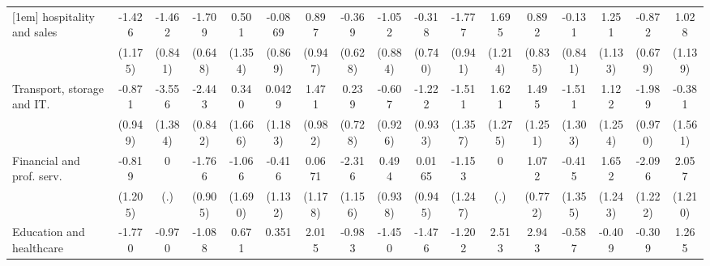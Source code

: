 {\begin{tabular}{l*{16}{c}}
[1em]
hospitality and sales&      -1.426         &      -1.462         &      -1.709\sym{**} &       0.501         &     -0.0869         &       0.897         &      -0.369         &      -1.052         &      -0.318         &      -1.777         &       1.695         &       0.892         &      -0.131         &       1.251         &      -0.872         &       1.028         \\
                    &     (1.175)         &     (0.841)         &     (0.648)         &     (1.354)         &     (0.869)         &     (0.947)         &     (0.628)         &     (0.884)         &     (0.740)         &     (0.941)         &     (1.214)         &     (0.835)         &     (0.841)         &     (1.133)         &     (0.679)         &     (1.139)         \\
[1em]
Transport, storage and IT.&      -0.871         &      -3.556\sym{*}  &      -2.443\sym{**} &       0.340         &      0.0429         &       1.471         &       0.239         &      -0.607         &      -1.222         &      -1.511         &       1.621         &       1.495         &      -1.511         &       1.122         &      -1.989\sym{*}  &      -0.381         \\
                    &     (0.949)         &     (1.384)         &     (0.842)         &     (1.666)         &     (1.183)         &     (0.982)         &     (0.728)         &     (0.926)         &     (0.933)         &     (1.357)         &     (1.275)         &     (1.251)         &     (1.303)         &     (1.254)         &     (0.970)         &     (1.561)         \\
[1em]
Financial and prof. serv.&      -0.819         &           0         &      -1.766         &      -1.066         &      -0.416         &      0.0671         &      -2.316\sym{*}  &       0.494         &      0.0165         &      -1.153         &           0         &       1.072         &      -0.415         &       1.652         &      -2.096         &       2.057         \\
                    &     (1.205)         &         (.)         &     (0.905)         &     (1.690)         &     (1.132)         &     (1.178)         &     (1.156)         &     (0.938)         &     (0.945)         &     (1.247)         &         (.)         &     (0.772)         &     (1.355)         &     (1.243)         &     (1.222)         &     (1.210)         \\
[1em]
Education and healthcare&      -1.770         &      -0.970         &      -1.088         &       0.671         &       0.351         &       2.015\sym{*}  &      -0.983         &      -1.450         &      -1.476         &      -1.202         &       2.513\sym{*}  &       2.943\sym{**} &      -0.587         &      -0.409         &      -0.309         &       1.265         \\

\end{tabular}}
